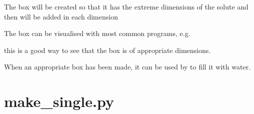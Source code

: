 \documentclass[letterpaper,10pt,english]{sphinxmanual}
\begin{document}
The box will be created so that it has the extreme dimensions of the solute and then  will be added in each dimension

The box can be visualised with most common programs, e.g.

%
\begin{sphinxVerbatim}[commandchars=\\\{\}]
   
\end{sphinxVerbatim}

this is a good way to see that the box is of appropriate dimensions.

When an appropriate box has been made, it can be used by  to fill it with water.


\section{make\_single.py}
\label{\detokenize{tools:make-single-py}}

%
\begin{sphinxVerbatim}[commandchars=\\\{\}]
        
          
          
\end{sphinxVerbatim}
\end{document}
